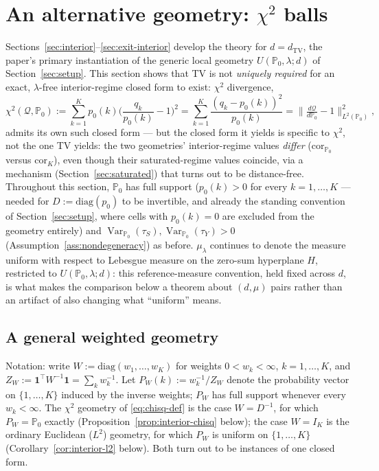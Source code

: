 \documentclass[11pt]{article}
\theoremstyle{plain}
\theoremstyle{definition}
\theoremstyle{remark}
\newcommand{\PP}{\mathbb{P}}
\newcommand{\Q}{\mathcal{Q}}
\newcommand{\Corr}{\mathrm{cor}}
\DeclareMathOperator{\Var}{Var}
\begin{document}
\section{An alternative geometry: $\chi^2$ balls}\label{sec:chisq}

Sections~\ref{sec:interior}--\ref{sec:exit-interior} develop the theory for
$d=d_{\mathrm{TV}}$, the paper's primary instantiation of the generic local
geometry $U(\PP_0,\lambda;d)$ of Section~\ref{sec:setup}. This section shows that
TV is not \emph{uniquely required} for an exact, $\lambda$-free interior-regime
closed form to exist: $\chi^2$ divergence,
\begin{equation}\label{eq:chisq-def}
    \chi^2(\Q,\PP_0) := \sum_{k=1}^Kp_0(k)\Big(\frac{q_k}{p_0(k)}-1\Big)^2
    = \sum_{k=1}^K\frac{(q_k-p_0(k))^2}{p_0(k)} = \big\|\tfrac{d\Q}{d\PP_0}-1\big\|_{L^2(\PP_0)}^2,
\end{equation}
admits its own such closed form --- but the closed form it yields is specific to
$\chi^2$, not the one TV yields: the two geometries' interior-regime values
\emph{differ} ($\Corr_{\PP_0}$ versus $\Corr_K$), even though their saturated-regime
values coincide, via a mechanism (Section~\ref{sec:saturated}) that turns out to be
distance-free. Throughout this section, $\PP_0$ has full support ($p_0(k)>0$ for
every $k=1,\dots,K$ --- needed for $D:=\mathrm{diag}(p_0)$ to be invertible, and
already the standing convention of Section~\ref{sec:setup}, where cells with
$p_0(k)=0$ are excluded from the geometry entirely) and
$\Var_{\PP_0}(\tau_S),\Var_{\PP_0}(\tau_Y)>0$ (Assumption~\ref{ass:nondegeneracy})
as before. $\mu_\lambda$ continues to denote the measure uniform with respect to
Lebesgue measure on the zero-sum hyperplane $H$, restricted to $U(\PP_0,\lambda;d)$:
this reference-measure convention, held fixed across $d$, is what makes the
comparison below a theorem about $(d,\mu)$ pairs rather than an artifact of also
changing what ``uniform'' means.

\subsection{A general weighted geometry}

Notation: write $W:=\mathrm{diag}(w_1,\dots,w_K)$ for weights $0<w_k<\infty$,
$k=1,\dots,K$, and $Z_W:=\mathbf1^\top W^{-1}\mathbf1=\sum_kw_k^{-1}$. Let
$P_W(k):=w_k^{-1}/Z_W$ denote the probability vector on $\{1,\dots,K\}$ induced by the
inverse weights; $P_W$ has full support whenever every $w_k<\infty$. The $\chi^2$
geometry of \eqref{eq:chisq-def} is the case $W=D^{-1}$, for which $P_W=\PP_0$ exactly
(Proposition~\ref{prop:interior-chisq} below); the case $W=I_K$ is the ordinary
Euclidean ($L^2$) geometry, for which $P_W$ is uniform on $\{1,\dots,K\}$
(Corollary~\ref{cor:interior-l2} below). Both turn out to be instances of one closed
form.
\end{document}
